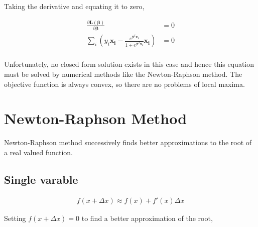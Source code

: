 \documentclass[11pt, a4paper]{article}
\begin{document}
Taking the derivative and equating it to zero,


\begin{align*}
	\frac{\partial \boldsymbol{L}(\boldsymbol{\beta})} {\partial \boldsymbol{\beta}}                                                                          & = 0 \\
	\sum_i \left(y_i \boldsymbol{x_i} - \frac{e^{\boldsymbol{\beta}^T\boldsymbol{x_i}}}{1 + e^{\boldsymbol{\beta}^T\boldsymbol{x_i}}} \boldsymbol{x_i}\right) & = 0 \\
\end{align*}

Unfortunately, no closed form solution exists in this case and hence this equation must be solved by numerical methods like the Newton-Raphson method. The objective function is always convex, so there are no problems of local maxima.

\section {Newton-Raphson Method}

Newton-Raphson method successively finds better approximations to the root of a real valued function.

\subsection {Single varable}

\begin{figure}[htbp]
	\centering
\end{figure}

\begin{align*}
	f(x+\Delta x) \approx f(x) + f'(x) \Delta x 
\end{align*}

Setting $f(x+\Delta x) = 0$ to find a better approximation of the root,
\end{document}
